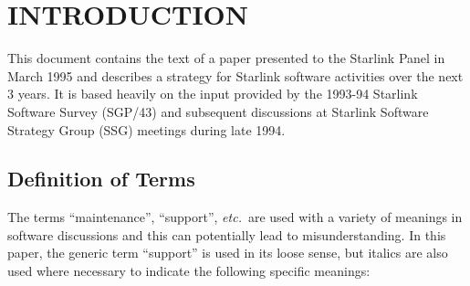 \documentclass[twoside,11pt]{article}
\newcommand{\stardocinitials}  {SGP}
\newcommand{\stardocnumber}    {42.1}
\newcommand{\stardocname}{\stardocinitials /\stardocnumber}
\newcommand{\htmladdimg}[1]{}
\newenvironment{latexonly}{}{}
\newcommand{\htmlref}[2]{#1}
\newcommand{\htmladdtonavigation}[1]{}
\newcommand{\latexonlytoc}[0]{\tableofcontents}
\newcommand{\qt}[1]{``#1''}
\newcommand{\st}[1]{{\em{#1}}}
\newcommand{\qt}[1]{{\tt{"}}#1{\tt{"}}}
\begin{document}

\begin{latexonly}
   \setlength{\parskip}{0mm}
   \latexonlytoc
   \setlength{\parskip}{\medskipamount}
   \markright{\stardocname}
\end{latexonly}


\section{INTRODUCTION}

This document contains the text of a paper presented to the Starlink
Panel in March 1995 and describes a strategy for Starlink software
activities over the next 3 years. It is based heavily on the input
provided by the 1993-94 Starlink Software Survey (SGP/43) 
and subsequent discussions at Starlink Software Strategy Group
(SSG) meetings during late 1994.

\subsection{Definition of Terms}

The terms \qt{maintenance}, \qt{support}, \st{etc.}\ are used with a
variety of meanings in software discussions and this can potentially
lead to misunderstanding. In this paper, the generic term \qt{support}
is used in its loose sense, but italics are also used where necessary
to indicate the following specific meanings:
\end{document}
